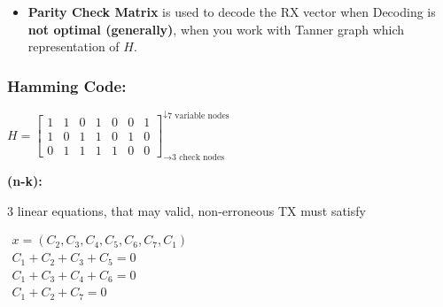 \documentclass[11pt]{article}
\providecommand{\tightlist}{%
      \setlength{\itemsep}{0pt}\setlength{\parskip}{0pt}}
\begin{document}
    \begin{itemize}
\tightlist
\item
  \textbf{Parity Check Matrix} is used to decode the RX vector when
  Decoding is \textbf{not optimal (generally)}, when you work with
  Tanner graph which representation of \(H\).
\end{itemize}

\subsubsection{Hamming Code:}\label{hamming-code}

\(H = \begin{bmatrix} 1 & 1 & 0 & 1 & 0 & 0 & 1 \\ 1 & 0 & 1 & 1 & 0 & 1 & 0 \\ 0 & 1 & 1 & 1 & 1 & 0 & 0 \end{bmatrix}_{\to \text{3 check nodes}}^{\downarrow \text{7 variable nodes}}\)

\textbf{(n-k):}

3 linear equations, that may valid, non-erroneous TX must satisfy

\(\begin{align*} x = (C_2, C_3, C_4, C_5, C_6, C_7, C_1) \\ C_1 + C_2 + C_3 + C_5 = 0 \\ C_1 + C_3 + C_4 + C_6 = 0 \\ C_1 + C_2 + C_7 = 0 \end{align*}\)
\end{document}
